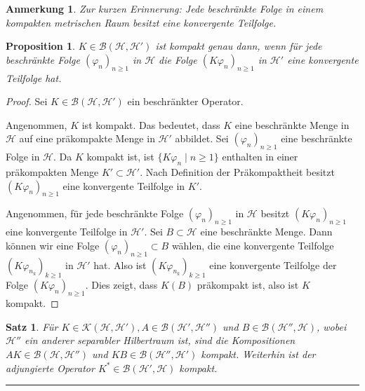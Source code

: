 \documentclass[11pt, hidelinks]{article}
\newcommand{\h}{\mathcal{H}}
\numberwithin{conj}{section}
\newtheorem{remark}[conj]{Anmerkung}
\newtheorem{theorem}[conj]{Satz}
\newtheorem{proposition}[conj]{Proposition}
\begin{document}
\begin{remark}
Zur kurzen Erinnerung: Jede beschränkte Folge in einem kompakten metrischen Raum besitzt eine konvergente Teilfolge.
\end{remark}

\begin{proposition}
    $K \in \mathcal{B}(\h,\h')$ ist kompakt genau dann, wenn für jede beschränkte Folge $(\varphi_n)_{n \geq 1}$ in $\h$ die Folge $(K\varphi_n)_{n \geq 1}$ in $\h'$ eine konvergente Teilfolge hat.
\end{proposition}

\begin{proof}
Sei $K \in \mathcal{B}(\h,\h')$ ein beschränkter Operator.

Angenommen, $K$ ist kompakt. Das bedeutet, dass $K$ eine beschränkte Menge in $\h$ auf eine präkompakte Menge in $\h'$ abbildet. Sei $(\varphi_n)_{n \geq 1}$ eine beschränkte Folge in $\h$. Da $K$ kompakt ist, ist $\{K\varphi_n \; \vert \; n \geq 1\}$ enthalten in einer präkompakten Menge $K' \subset \h'$. Nach Definition der Präkompaktheit besitzt $(K\varphi_n)_{n \geq 1}$ eine konvergente Teilfolge in $K'$.

Angenommen, für jede beschränkte Folge $(\varphi_n)_{n \geq 1}$ in $\h$ besitzt $(K\varphi_n)_{n \geq 1}$ eine konvergente Teilfolge in $\h'$. Sei $B \subset \h$ eine beschränkte Menge. Dann können wir eine Folge $(\varphi_n)_{n \geq 1} \subset B$ wählen, die eine konvergente Teilfolge $(K\varphi_{n_k})_{k \geq 1}$ in $\h'$ hat. Also ist $(K\varphi_{n_k})_{k \geq 1}$ eine konvergente Teilfolge der Folge $(K\varphi_{n})_{n \geq 1}$. Dies zeigt, dass $K(B)$ präkompakt ist, also ist $K$ kompakt.
\end{proof}

\begin{theorem}
    Für $K \in \mathcal{K}(\h,\h'), A \in \mathcal{B}(\h',\h'')$ und $B \in \mathcal{B}(\h'',\h)$, wobei $\h''$ ein anderer separabler Hilbertraum ist, sind die Kompositionen $AK \in \mathcal{B}(\h,\h'')$ und $KB \in \mathcal{B}(\h'',\h')$ kompakt. Weiterhin ist der adjungierte Operator $K^\ast \in \mathcal{B}(\h',\h)$ kompakt.
\end{theorem}

\hrule
\end{document}
